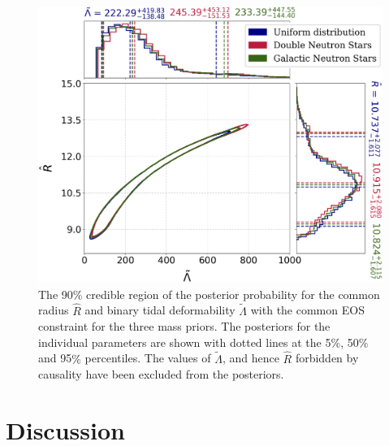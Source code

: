 \begin{figure}[t]
  \includegraphics[width=\textwidth]{Figures/common-radius/Radius_lambda_bothspins.png}
  \caption{The 90\% credible region of the posterior probability for the common radius $\hat{R}$ and binary tidal deformability $\tilde\Lambda$ with the common EOS constraint for the three mass priors. The posteriors for the individual parameters are shown with dotted lines at  the 5$\%$, 50$\%$ and 95$\%$ percentiles. The values of $\tilde\Lambda$, and hence $\hat{R}$ forbidden by causality have been excluded from the posteriors. 
\label{fig:radius_lambda}%
}
\end{figure}

\section{Discussion}

